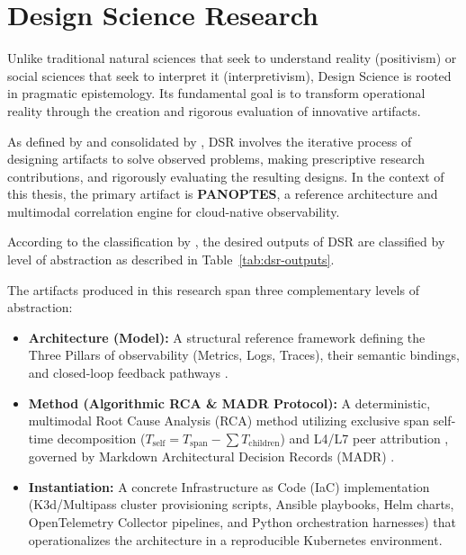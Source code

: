 \section{Design Science Research}
\label{sec:dsr-approach}

Unlike traditional natural sciences that seek to understand reality (positivism) or social sciences that seek to interpret it (interpretivism), Design Science is rooted in pragmatic epistemology. Its fundamental goal is to transform operational reality through the creation and rigorous evaluation of innovative artifacts.

As defined by  and consolidated by , DSR involves the iterative process of designing artifacts to solve observed problems, making prescriptive research contributions, and rigorously evaluating the resulting designs. In the context of this thesis, the primary artifact is \textbf{PANOPTES}, a reference architecture and multimodal correlation engine for cloud-native observability.

According to the classification by , the desired outputs of DSR are classified by level of abstraction as described in Table~\ref{tab:dsr-outputs}.



The artifacts produced in this research span three complementary levels of abstraction:
\begin{itemize}
    \item \textbf{Architecture (Model):} A structural reference framework defining the Three Pillars of observability (Metrics, Logs, Traces), their semantic bindings, and closed-loop feedback pathways \cite{jansen_2005, capilla_2016}.
    \item \textbf{Method (Algorithmic RCA \& MADR Protocol):} A deterministic, multimodal Root Cause Analysis (RCA) method utilizing exclusive span self-time decomposition ($T_{\text{self}} = T_{\text{span}} - \sum T_{\text{children}}$) and L4/L7 peer attribution \cite{sigelman_2010, wang_2024, barata_2026}, governed by Markdown Architectural Decision Records (MADR) \cite{nygard_2011, kopp_2018}.
    \item \textbf{Instantiation:} A concrete Infrastructure as Code (IaC) implementation (K3d/Multipass cluster provisioning scripts, Ansible playbooks, Helm charts, OpenTelemetry Collector pipelines, and Python orchestration harnesses) that operationalizes the architecture in a reproducible Kubernetes environment.
\end{itemize}

